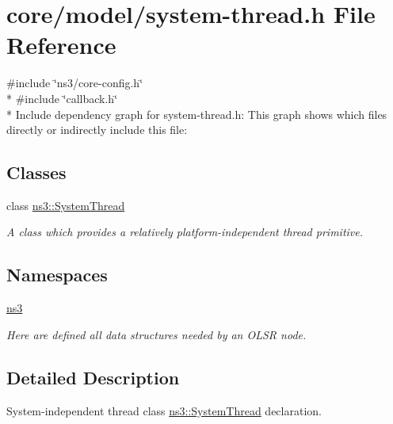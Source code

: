 \hypertarget{system-thread_8h}{}\section{core/model/system-\/thread.h File Reference}
\label{system-thread_8h}
{\ttfamily \#include \char`\"{}ns3/core-\/config.\+h\char`\"{}}\\*
{\ttfamily \#include \char`\"{}callback.\+h\char`\"{}}\\*
Include dependency graph for system-\/thread.h\+:
This graph shows which files directly or indirectly include this file\+:
\subsection*{Classes}
\begin{DoxyCompactItemize}
\item 
class \hyperlink{classns3_1_1SystemThread}{ns3\+::\+System\+Thread}
\begin{DoxyCompactList}\small\item\em A class which provides a relatively platform-\/independent thread primitive. \end{DoxyCompactList}\end{DoxyCompactItemize}
\subsection*{Namespaces}
\begin{DoxyCompactItemize}
\item 
 \hyperlink{namespacens3}{ns3}
\begin{DoxyCompactList}\small\item\em Here are defined all data structures needed by an O\+L\+SR node. \end{DoxyCompactList}\end{DoxyCompactItemize}


\subsection{Detailed Description}
System-\/independent thread class \hyperlink{classns3_1_1SystemThread}{ns3\+::\+System\+Thread} declaration. 
